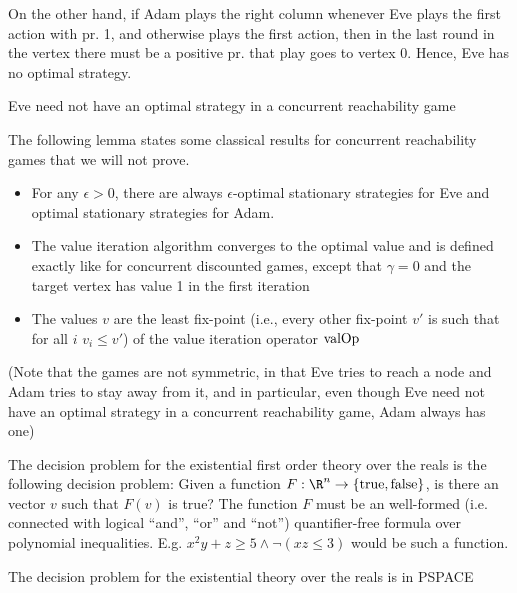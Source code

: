 On the other hand, if Adam plays the right column whenever Eve plays the first action with pr. 1, and otherwise plays the first action, 
then in the last round in the vertex there must be a positive pr. that play goes to vertex 0. Hence, Eve has no optimal strategy.


\begin{lemma}\label{lemm:no_opt_reach}
Eve need not have an optimal strategy in a concurrent reachability game
\end{lemma}

The following lemma states some classical results for concurrent reachability games that we will not prove.
\begin{lemma}\label{lemm:reach_class}
\begin{itemize}
\item For any $\epsilon>0$, there are always $\epsilon$-optimal stationary strategies for Eve and optimal stationary strategies for Adam. 
\item The value iteration algorithm converges to the optimal value and is defined exactly like for concurrent discounted games, except that $\gamma=0$ and the target vertex has value 1 in the first iteration
\item The values $v$ are the least fix-point (i.e., every other fix-point $v'$ is such that for all $i$ $v_i\leq v'$) of the value iteration operator $\text{valOp}$

\end{itemize}
\end{lemma}
(Note that the games are not symmetric, in that Eve tries to reach a node and Adam tries to stay away from it, and in particular, even though Eve need not have an optimal strategy in a concurrent reachability game, Adam always has one)






The decision problem for the existential first order theory over the reals is the following decision problem:
Given a function $F:\R^n\rightarrow \{\text{true},\text{false}\}$, is there an vector $v$ such that $F(v)$ is true?
The function $F$ must be an well-formed (i.e. connected with logical ``and'', ``or'' and ``not'') quantifier-free formula over polynomial inequalities.
E.g. $x^2y+z\geq 5\wedge \neg (xz\leq 3)$ would be such a function.

\begin{lemma}
The decision problem for the existential theory over the reals is in PSPACE
\end{lemma} 

